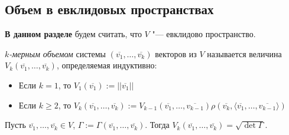 \subsection{Объем в евклидовых пространствах}

\textbf{В данном разделе} будем считать, что $V$ "--- евклидово пространство.

\begin{definition}
	\textit{$k$-мерным объемом} системы $(\overline{v_1}, \dots, \overline{v_k})$ векторов из $V$ называется величина $V_k(\overline{v_1}, \dots, \overline{v_k})$, определяемая индуктивно:
	\begin{itemize}
		\item Если $k = 1$, то $V_1(\overline{v_1}) := ||\overline{v_1}||$
		\item Если $k \ge 2$, то $V_k(\overline{v_1}, \dots, \overline{v_k}) := V_{k - 1}(\overline{v_1}, \dots, \overline{v_{k - 1}})\rho(\overline{v_k}, \langle\overline{v_1}, \dots, \overline{v_{k - 1}}\rangle)$
	\end{itemize}
\end{definition}

\begin{theorem}
	Пусть $\overline{v_1}, \dots, \overline{v_k} \in V$, $\Gamma := \Gamma(\overline{v_1}, \dots, \overline{v_k})$. Тогда $V_k(\overline{v_1}, \dots, \overline{v_k}) = \sqrt{\det{\Gamma}}$.
\end{theorem}

